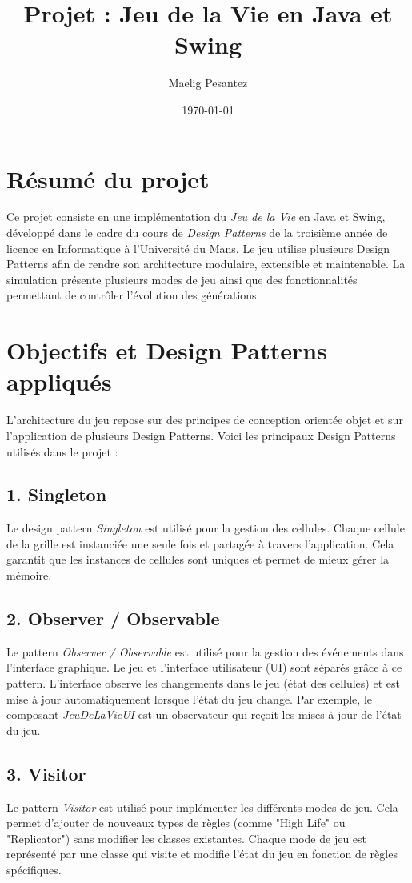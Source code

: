\documentclass[a4paper,12pt]{article}
\title{Projet : Jeu de la Vie en Java et Swing}
\author{Maelig Pesantez}
\date{\today}
\begin{document}
\maketitle

\section*{Résumé du projet}
Ce projet consiste en une implémentation du \textit{Jeu de la Vie} en Java et Swing, développé dans le cadre du cours de \textit{Design Patterns} de la troisième année de licence en Informatique à l'Université du Mans. Le jeu utilise plusieurs Design Patterns afin de rendre son architecture modulaire, extensible et maintenable. La simulation présente plusieurs modes de jeu ainsi que des fonctionnalités permettant de contrôler l'évolution des générations.

\section*{Objectifs et Design Patterns appliqués}
L'architecture du jeu repose sur des principes de conception orientée objet et sur l'application de plusieurs Design Patterns. Voici les principaux Design Patterns utilisés dans le projet :

\subsection*{1. Singleton}
Le design pattern \textit{Singleton} est utilisé pour la gestion des cellules. Chaque cellule de la grille est instanciée une seule fois et partagée à travers l'application. Cela garantit que les instances de cellules sont uniques et permet de mieux gérer la mémoire.

\subsection*{2. Observer / Observable}
Le pattern \textit{Observer / Observable} est utilisé pour la gestion des événements dans l'interface graphique. Le jeu et l'interface utilisateur (UI) sont séparés grâce à ce pattern. L'interface observe les changements dans le jeu (état des cellules) et est mise à jour automatiquement lorsque l'état du jeu change. Par exemple, le composant \textit{JeuDeLaVieUI} est un observateur qui reçoit les mises à jour de l'état du jeu.

\subsection*{3. Visitor}
Le pattern \textit{Visitor} est utilisé pour implémenter les différents modes de jeu. Cela permet d'ajouter de nouveaux types de règles (comme "High Life" ou "Replicator") sans modifier les classes existantes. Chaque mode de jeu est représenté par une classe qui visite et modifie l'état du jeu en fonction de règles spécifiques.
\end{document}
